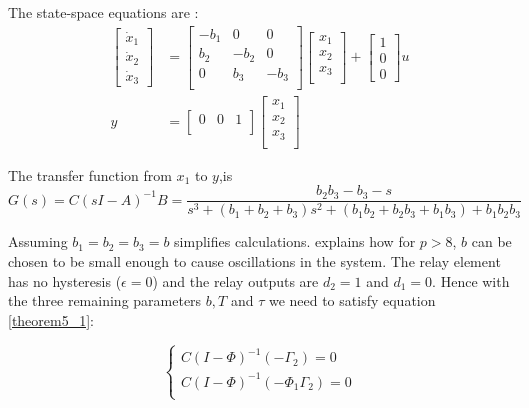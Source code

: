 \documentclass[a4paper]{article}
\begin{document}
The state-space equations are :
\begin{align}
\begin{bmatrix}
	\dot{x}_1 \\ \dot{x}_2 \\ \dot{x}_3
	\end{bmatrix}
	&= \begin{bmatrix}
	-b_1 & 0 & 0 \\
	b_2 & -b_2 & 0 \\
	0 & b_3 & -b_3 \\
	\end{bmatrix}
	\begin{bmatrix}
	x_1 \\ x_2 \\ x_3 \\
	\end{bmatrix}
	+ 
	\begin{bmatrix}
	1 \\ 0 \\ 0
	\end{bmatrix}
	u \\
	y &= \begin{bmatrix}
	0 & 0 & 1 \\
	\end{bmatrix}
	\begin{bmatrix}
	x_1 \\x_2 \\x_3\\
	\end{bmatrix}
\end{align} 

The transfer function from $x_1$ to $y$,is 
 $$G(s) = C(sI-A)^{-1}B = \frac{b_2b_3 -b_3 -s}{s^3 + (b_1 + b_2 + b_3)s^2 + (b_1b_2 + b_2b_3 + b_1b_3) + b_1b_2b_3}$$

Assuming $b_1 = b_2 = b_3 = b$ simplifies calculations.  \cite{fall} explains how for $p>8$, $b$ can be chosen to be small enough to cause oscillations in the system. The relay element has no hysteresis ($\epsilon = 0$) and the relay outputs are $d_2 = 1$ and $d_1 = 0$. Hence with the three remaining parameters $b,T$ and $\tau$ we need to satisfy equation \ref{theorem5_1}:

\begin{equation}
\label{goodwin_theorem5_1}
\begin{cases}
	        C(I - \Phi)^{-1}( - \Gamma_2) = 0\\
	        C(I - \Phi)^{-1}(-\Phi_1\Gamma_2) = 0\\
	              
	            \end{cases}
\end{equation}
\end{document}
